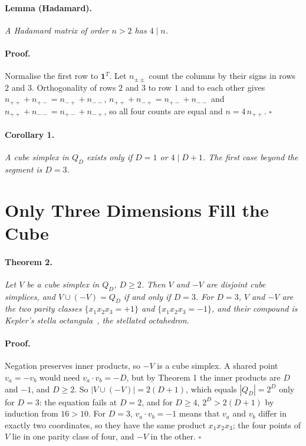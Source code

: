 \documentclass[twocolumn]{iopjournal}
\begin{document}
\paragraph{Lemma (Hadamard).} \textit{A Hadamard matrix of order
$n > 2$ has $4 \mid n$.}

\paragraph{Proof.} Normalise the first row to $\mathbf{1}^T$. Let
$n_{\pm\pm}$ count the columns by their signs in rows $2$ and $3$.
Orthogonality of rows $2$ and $3$ to row $1$ and to each other gives
$n_{++} + n_{+-} = n_{-+} + n_{--}$,
$n_{++} + n_{-+} = n_{+-} + n_{--}$ and
$n_{++} + n_{--} = n_{+-} + n_{-+}$, so all four counts are equal
and $n = 4\,n_{++}$. \hfill $\square$

\paragraph{Corollary 1.} \textit{A cube simplex in $Q_D$ exists
only if $D = 1$ or $4 \mid D + 1$. The first case beyond the
segment is $D = 3$.}


\section*{Only Three Dimensions Fill the Cube}

\paragraph{Theorem 2.} \textit{Let $V$ be a cube simplex in $Q_D$,
$D \ge 2$. Then $V$ and $-V$ are disjoint cube simplices, and
$V \cup (-V) = Q_D$ if and only if $D = 3$. For $D = 3$, $V$ and
$-V$ are the two parity classes $\{x_1x_2x_3 = +1\}$ and
$\{x_1x_2x_3 = -1\}$, and their compound is Kepler's stella
octangula~\cite{Kepler1619,Cromwell1997}, the stellated
octahedron.}

\paragraph{Proof.} Negation preserves inner products, so $-V$ is a
cube simplex. A shared point $v_a = -v_b$ would need
$v_a \cdot v_b = -D$, but by Theorem 1 the inner products are $D$
and $-1$, and $D \ge 2$. So $|V \cup (-V)| = 2(D+1)$, which equals
$|Q_D| = 2^D$ only for $D = 3$: the equation fails at $D = 2$, and
for $D \ge 4$, $2^D > 2(D+1)$ by induction from $16 > 10$. For
$D = 3$, $v_a \cdot v_b = -1$ means that $v_a$ and $v_b$ differ in
exactly two coordinates, so they have the same product
$x_1x_2x_3$; the four points of $V$ lie in one parity class of
four, and $-V$ in the other. \hfill $\square$
\end{document}
